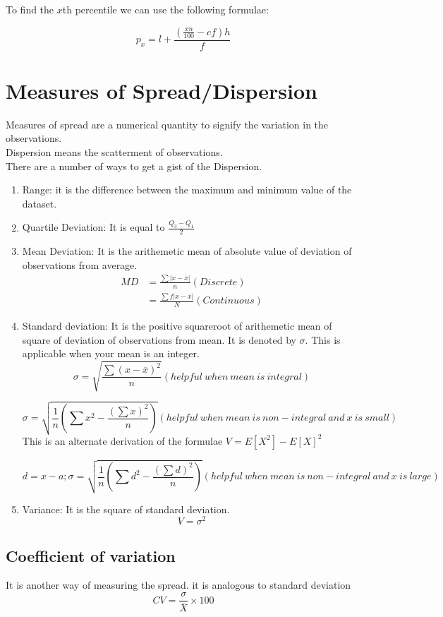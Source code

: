\documentclass[11pt,letterpaper]{article}
\begin{document}
To find the $x$th percentile we can use the following formulae:

\[
  p_{x} =l + \frac{\left( \frac{x n}{100} - cf \right)h}{f} 
\]

\section{Measures of Spread/Dispersion}

Measures of spread are a numerical quantity to signify the variation in the observations.\\
Dispersion means the scatterment of observations. \\
There are a number of ways to get a gist of the Dispersion. 

\begin{enumerate}
  \item Range: it is the difference between the maximum and minimum value of the dataset. 
  \item Quartile Deviation: It is equal to $\frac{Q_3-Q_1}{2}$
  \item Mean Deviation: It is the arithemetic mean of absolute value of deviation of observations from average. 
    \begin{align*}
      MD &= \frac{\sum \lvert x - \overline{x} \rvert}{n} ( Discrete )\\
         &=  \frac{\sum f \lvert x - \overline{x} \rvert}{N} ( Continuous )
    \end{align*}
  \item Standard deviation: It is the positive squareroot of arithemetic mean of square of deviation of observations 
    from mean. It is denoted by $\sigma$. This is applicable when your mean is an integer.
    \[
      \sigma = \sqrt{\frac{\sum (x - \overline{x})^2}{n}} ( helpful\ when\ mean\ is\ integral )
    \]

    \[
      \sigma = \sqrt{\frac{1}{n}\left( \sum x^2 - \frac{(\sum x)^2}{n}\right)} ( helpful\ when\ mean\ is\ non-integral\ and\ x\ is\ small )
    \]
    This is an alternate derivation of the formulae $V = E[X^2]-E[X]^2$

    \[
      d = x-a; 
      \sigma = \sqrt{\frac{1}{n}\left( \sum d^2 - \frac{(\sum d)^2}{n}\right)} ( helpful\ when\ mean\ is\ non-integral\ and\ x\ is\ large )
    \]
  \item Variance: It is the square of standard deviation. 
    \[
      V = \sigma^2 
    \]
\end{enumerate}

\subsection{Coefficient of variation}
It is another way of measuring the spread. it is analogous to standard deviation
\[
  CV = \frac{\sigma}{\overline{X}} \times 100
\]
\end{document}
